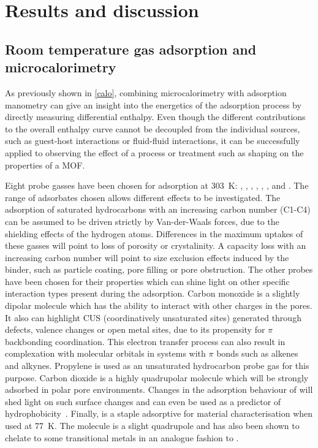 
\section{Results and discussion}




\subsection{Room temperature gas adsorption and microcalorimetry}

As previously shown in \autoref{calo},
combining microcalorimetry with adsorption manometry
can give an insight into the energetics of the
adsorption process by directly measuring differential enthalpy.
Even though the different contributions to the overall enthalpy curve
cannot be decoupled from the individual sources, such as guest-host
interactions or fluid-fluid interactions, it can be successfully
applied to observing the effect of a process or treatment such as shaping
on the properties of a \gls{MOF}.

Eight probe gasses have been chosen for adsorption at \SI{303}{\kelvin}:
, , , , , ,
 and .
The range of adsorbates chosen allows different effects to be investigated.
The adsorption of saturated hydrocarbons with an increasing
carbon number (C1-C4) can be
assumed to be driven strictly by Van-der-Waals forces,
due to the shielding effects of the hydrogen atoms.
Differences in the maximum uptakes of these gasses will point to
loss of porosity or crystalinity. A capacity loss with
an increasing carbon number will point to size exclusion effects
induced by the binder, such as particle coating, pore filling or
pore obstruction.
The other probes have been chosen for their properties which can
shine light on other specific interaction types
present during the adsorption.
Carbon monoxide is a slightly dipolar molecule which has the
ability to interact with other charges in the pores.
It also can highlight \gls{CUS} (coordinatively unsaturated sites)
generated through defects, valence changes or open metal sites, due to its
propensity for \( \pi \) backbonding coordination.
This electron transfer process can also result in complexation with
molecular orbitals in systems with \( \pi \) bonds such as alkenes 
and alkynes.
Propylene is used as an unsaturated hydrocarbon probe gas for this purpose.
Carbon dioxide is a highly quadrupolar molecule which will be
strongly adsorbed in polar pore environments. Changes in the adsorption
behaviour of  will shed light on such surface changes and
can even be used as a predictor
of hydrophobicity~\cite{chanutScreeningEffectWater2017}.
Finally,  is a staple adsorptive for material characterisation
when used at \SI{77}{\kelvin}. The molecule is a slight quadrupole
and has also been shown to chelate to some transitional metals in
an analogue fashion to .

